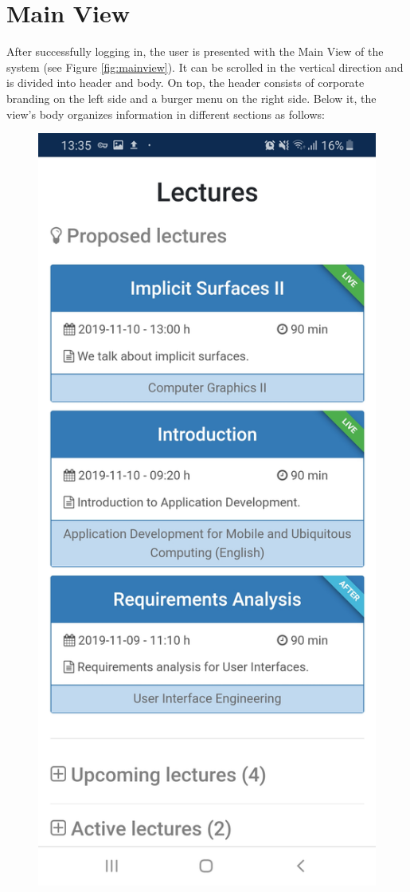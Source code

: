\section{Main View}
\label{section:soa:mainview}
After successfully logging in, the user is presented with the Main View of the system (see Figure \ref{fig:mainview}).
It can be scrolled in the vertical direction and is divided into header and body. On top, the header consists of corporate branding on the left side and a burger menu on the right side. Below it, the view's body organizes information in different sections as follows:

\begin{figure}
	\centering
	\begin{minipage}[t]{.5\textwidth}
		\centering
		\includegraphics[width=0.95\linewidth]{screenshots/main_view_1.jpg}

\end{minipage}
\end{figure}
